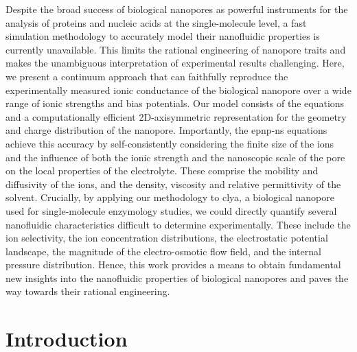 Despite the broad success of biological nanopores as powerful instruments for the analysis of proteins and
nucleic acids at the single-molecule level, a fast simulation methodology to accurately model their
nanofluidic properties is currently unavailable. This limits the rational engineering of nanopore traits and
makes the unambiguous interpretation of experimental results challenging. Here, we present a continuum
approach that can faithfully reproduce the experimentally measured ionic conductance of the biological
nanopore  over a wide range of ionic strengths and bias potentials. Our model consists of the
 equations and a computationally efficient 2D-axisymmetric representation for the geometry
and charge distribution of the nanopore. Importantly, the \gls{epnp-ns} equations achieve this accuracy by
self-consistently considering the finite size of the ions and the influence of both the ionic strength and the
nanoscopic scale of the pore on the local properties of the electrolyte. These comprise the mobility and
diffusivity of the ions, and the density, viscosity and relative permittivity of the solvent. Crucially, by
applying our methodology to \gls{clya}, a biological nanopore used for single-molecule enzymology studies, we
could directly quantify several nanofluidic characteristics difficult to determine experimentally. These
include the ion selectivity, the ion concentration distributions, the electrostatic potential landscape, the
magnitude of the electro-osmotic flow field, and the internal pressure distribution. Hence, this work provides
a means to obtain fundamental new insights into the nanofluidic properties of biological nanopores and paves
the way towards their rational engineering.


\section{Introduction}
%
\label{sec:epnp-ns:intro}
%

